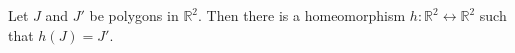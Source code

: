 Let $J$ and $J'$ be polygons in $\mathbb{R}^2$. Then there is a homeomorphism $h: \mathbb{R}^2 \leftrightarrow \mathbb{R}^2$ such that $h(J) = J'$.
